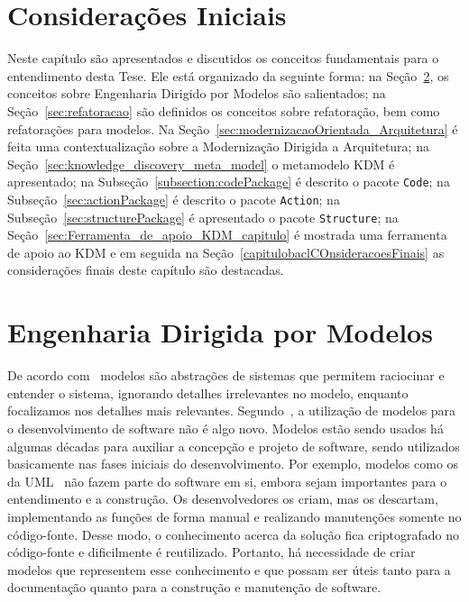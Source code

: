 
\section{Considerações Iniciais}

Neste capítulo são apresentados e discutidos os conceitos fundamentais para o entendimento desta Tese. Ele está organizado da seguinte forma: na Seção~\ref{Cap2_Sec2_Desenvolvimento_Dirigido_a_Modelos}, os conceitos sobre Engenharia Dirigido por Modelos são salientados; na Seção~\ref{sec:refatoracao} são definidos os conceitos sobre refatoração, bem como refatorações para modelos. Na Seção~\ref{sec:modernizacaoOrientada_Arquitetura} é feita uma contextualização sobre a Modernização Dirigida a Arquitetura; na Seção~\ref{sec:knowledge_discovery_meta_model} o metamodelo KDM é apresentado; na Subseção~\ref{subsection:codePackage} é descrito o pacote \texttt{Code}; na Subseção~\ref{sec:actionPackage} é descrito o pacote \texttt{Action}; na Subseção~\ref{sec:structurePackage} é apresentado o pacote \texttt{Structure}; na Seção~\ref{sec:Ferramenta_de_apoio_KDM_capitulo} é mostrada uma ferramenta de apoio ao KDM e em seguida na Seção~\ref{capitulobaclCOnsideracoesFinais} as considerações finais deste capítulo são destacadas.

\section{Engenharia Dirigida por Modelos}\label{Cap2_Sec2_Desenvolvimento_Dirigido_a_Modelos}

De acordo com~ modelos são abstrações de sistemas que permitem raciocinar e entender o sistema, ignorando detalhes irrelevantes no modelo, enquanto focalizamos nos detalhes mais relevantes. Segundo~, a utilização de modelos para o desenvolvimento de software não é algo novo. Modelos estão sendo usados há algumas décadas para auxiliar a  concepção e projeto de software, sendo utilizados basicamente nas fases iniciais do desenvolvimento. Por exemplo, modelos como os da UML~\cite{UML:OMG} não fazem parte do software em si, embora sejam importantes para o entendimento e a construção. Os desenvolvedores os criam, mas os descartam, implementando as funções de forma manual e realizando manutenções somente no código-fonte. Desse modo, o conhecimento acerca da solução fica criptografado no código-fonte e dificilmente é reutilizado. Portanto, há necessidade de criar modelos que representem esse conhecimento e que possam ser úteis tanto para a documentação quanto para a construção e manutenção de software.


